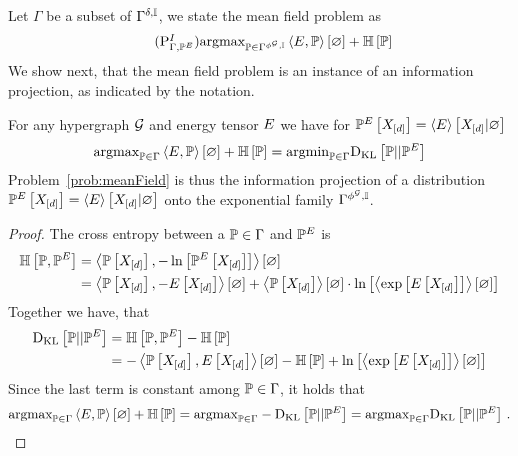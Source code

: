 Let $\Gamma$ be a subset of $\Gamma^{\delta,\mathbb{I}}$, we state the mean field problem as
\begin{align}
    \tag{$\probtagtypeinst{I}{\Gamma,\probof{\energytensor}}$}\label{prob:meanField}
    \argmax_{\probtensor\in \mnexpfamily} \sbcontraction{\energytensor,\probtensor} + \sentropyof{\probtensor}
\end{align}
We show next, that the mean field problem is an instance of an information projection, as indicated by the notation.

\begin{theorem}
    \label{the:meanFieldIProjection}
    For any hypergraph $\mathcal{G}$ and energy tensor $E$ we have for $\mathbb{P}^{E}\left[X_{[d]}\right]=\left\langle E\right\rangle \left[ X_{[d]} | \varnothing \right]$
    \begin{align*}
        \mathrm{argmax}_{\mathbb{P}\in\Gamma} \left\langle E,\mathbb{P}\right\rangle \left[ \varnothing \right] + \mathbb{H}\left[\mathbb{P}\right]
        = \mathrm{argmin}_{\mathbb{P}\in\Gamma} \mathrm{D}_{\mathrm{KL}}\left[ \mathbb{P} || \mathbb{P}^{E} \right]
    \end{align*}
    Problem~\ref{prob:meanField} is thus the information projection of a distribution $\mathbb{P}^{E}\left[X_{[d]}\right]=\left\langle E\right\rangle \left[ X_{[d]} | \varnothing \right]$ onto the exponential family $\Gamma^{\phi^{\mathcal{G}},\mathbb{I}}$.
\end{theorem}
\begin{proof}
    The cross entropy between a $\mathbb{P}\in\Gamma$ and $\mathbb{P}^{E}$ is
    \begin{align*}
        \mathbb{H}\left[\mathbb{P},\mathbb{P}^{E}\right]
        &= \left\langle \mathbb{P}\left[X_{[d]}\right],-\ln \left[ \mathbb{P}^{E}\left[X_{[d]}\right] \right]\right\rangle \left[ \varnothing \right] \\
        &= \left\langle \mathbb{P}\left[X_{[d]}\right],-E\left[X_{[d]}\right]\right\rangle \left[ \varnothing \right]
        + \left\langle \mathbb{P}\left[X_{[d]}\right]\right\rangle \left[ \varnothing \right] \cdot \ln \left[ \left\langle \mathrm{exp}\left[E\left[X_{[d]}\right]\right]\right\rangle \left[ \varnothing \right] \right]
    \end{align*}
    Together we have, that
    \begin{align*}
        \mathrm{D}_{\mathrm{KL}}\left[ \mathbb{P} || \mathbb{P}^{E} \right]
        &= \mathbb{H}\left[\mathbb{P},\mathbb{P}^{E}\right] - \mathbb{H}\left[\mathbb{P}\right] \\
        &= - \left\langle \mathbb{P}\left[X_{[d]}\right],E\left[X_{[d]}\right]\right\rangle \left[ \varnothing \right] - \mathbb{H}\left[\mathbb{P}\right] + \ln \left[ \left\langle \mathrm{exp}\left[E\left[X_{[d]}\right]\right]\right\rangle \left[ \varnothing \right] \right]
    \end{align*}
    Since the last term is constant among $\mathbb{P}\in\Gamma$, it holds that
    \begin{align*}
        \mathrm{argmax}_{\mathbb{P}\in\Gamma} \left\langle E,\mathbb{P}\right\rangle \left[ \varnothing \right]+ \mathbb{H}\left[\mathbb{P}\right]
        = \mathrm{argmax}_{\mathbb{P}\in\Gamma} -\mathrm{D}_{\mathrm{KL}}\left[ \mathbb{P} || \mathbb{P}^{E} \right]
        = \mathrm{argmax}_{\mathbb{P}\in\Gamma} \mathrm{D}_{\mathrm{KL}}\left[ \mathbb{P} || \mathbb{P}^{E} \right] \, .
    \end{align*}
\end{proof}


